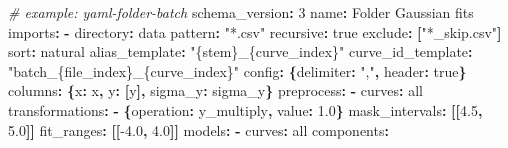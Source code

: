 \documentclass[
  10pt,
  a4paper,
  oneside]{scrreprt}
\newenvironment{Shaded}{}{}
\newcommand{\AttributeTok}[1]{\textcolor[rgb]{0.49,0.56,0.16}{#1}}
\newcommand{\CharTok}[1]{\textcolor[rgb]{0.25,0.44,0.63}{#1}}
\newcommand{\CommentTok}[1]{\textcolor[rgb]{0.38,0.63,0.69}{\textit{#1}}}
\newcommand{\DecValTok}[1]{\textcolor[rgb]{0.25,0.63,0.44}{#1}}
\newcommand{\FloatTok}[1]{\textcolor[rgb]{0.25,0.63,0.44}{#1}}
\newcommand{\FunctionTok}[1]{\textcolor[rgb]{0.02,0.16,0.49}{#1}}
\newcommand{\KeywordTok}[1]{\textcolor[rgb]{0.00,0.44,0.13}{\textbf{#1}}}
\newcommand{\StringTok}[1]{\textcolor[rgb]{0.25,0.44,0.63}{#1}}
\begin{document}
\begin{Shaded}
\begin{Highlighting}[]
\CommentTok{\# example: yaml{-}folder{-}batch}
\FunctionTok{schema\_version}\KeywordTok{:}\AttributeTok{ }\DecValTok{3}
\FunctionTok{name}\KeywordTok{:}\AttributeTok{ Folder Gaussian fits}
\FunctionTok{imports}\KeywordTok{:}
\AttributeTok{  }\KeywordTok{{-}}\AttributeTok{ }\FunctionTok{directory}\KeywordTok{:}\AttributeTok{ data}
\AttributeTok{    }\FunctionTok{pattern}\KeywordTok{:}\AttributeTok{ }\StringTok{"*.csv"}
\AttributeTok{    }\FunctionTok{recursive}\KeywordTok{:}\AttributeTok{ }\CharTok{true}
\AttributeTok{    }\FunctionTok{exclude}\KeywordTok{:}\AttributeTok{ }\KeywordTok{[}\StringTok{"*\_skip.csv"}\KeywordTok{]}
\AttributeTok{    }\FunctionTok{sort}\KeywordTok{:}\AttributeTok{ natural}
\AttributeTok{    }\FunctionTok{alias\_template}\KeywordTok{:}\AttributeTok{ }\StringTok{"\{stem\}\_\{curve\_index\}"}
\AttributeTok{    }\FunctionTok{curve\_id\_template}\KeywordTok{:}\AttributeTok{ }\StringTok{"batch\_\{file\_index\}\_\{curve\_index\}"}
\AttributeTok{    }\FunctionTok{config}\KeywordTok{:}\AttributeTok{ }\KeywordTok{\{}\FunctionTok{delimiter}\KeywordTok{:}\AttributeTok{ }\StringTok{","}\KeywordTok{,}\AttributeTok{ }\FunctionTok{header}\KeywordTok{:}\AttributeTok{ }\CharTok{true}\KeywordTok{\}}
\AttributeTok{    }\FunctionTok{columns}\KeywordTok{:}\AttributeTok{ }\KeywordTok{\{}\FunctionTok{x}\KeywordTok{:}\AttributeTok{ x}\KeywordTok{,}\AttributeTok{ }\FunctionTok{y}\KeywordTok{:}\AttributeTok{ }\KeywordTok{[}\CharTok{y}\KeywordTok{],}\AttributeTok{ }\FunctionTok{sigma\_y}\KeywordTok{:}\AttributeTok{ sigma\_y}\KeywordTok{\}}
\FunctionTok{preprocess}\KeywordTok{:}
\AttributeTok{  }\KeywordTok{{-}}\AttributeTok{ }\FunctionTok{curves}\KeywordTok{:}\AttributeTok{ all}
\AttributeTok{    }\FunctionTok{transformations}\KeywordTok{:}
\AttributeTok{      }\KeywordTok{{-}}\AttributeTok{ }\KeywordTok{\{}\FunctionTok{operation}\KeywordTok{:}\AttributeTok{ y\_multiply}\KeywordTok{,}\AttributeTok{ }\FunctionTok{value}\KeywordTok{:}\AttributeTok{ }\FloatTok{1.0}\KeywordTok{\}}
\AttributeTok{    }\FunctionTok{mask\_intervals}\KeywordTok{:}\AttributeTok{ }\KeywordTok{[[}\FloatTok{4.5}\KeywordTok{,}\AttributeTok{ }\FloatTok{5.0}\KeywordTok{]]}
\AttributeTok{    }\FunctionTok{fit\_ranges}\KeywordTok{:}\AttributeTok{ }\KeywordTok{[[}\FloatTok{{-}4.0}\KeywordTok{,}\AttributeTok{ }\FloatTok{4.0}\KeywordTok{]]}
\FunctionTok{models}\KeywordTok{:}
\AttributeTok{  }\KeywordTok{{-}}\AttributeTok{ }\FunctionTok{curves}\KeywordTok{:}\AttributeTok{ all}
\AttributeTok{    }\FunctionTok{components}\KeywordTok{:}

\end{Highlighting}
\end{Shaded}
\end{document}
